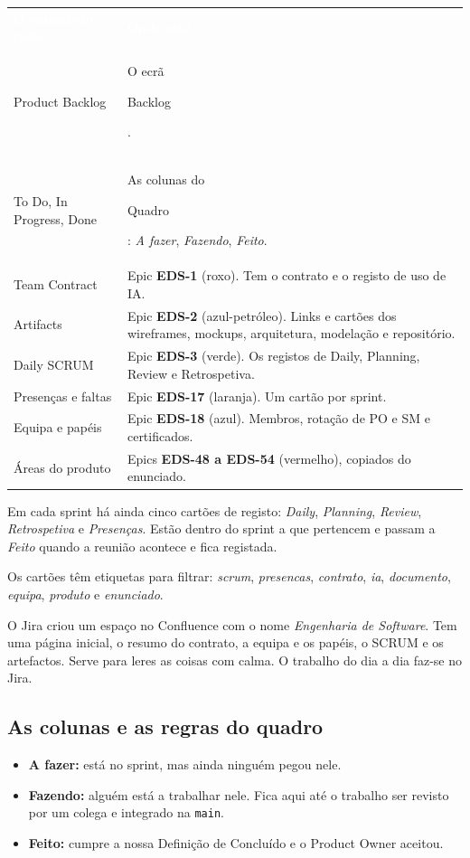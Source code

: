 \documentclass[11pt,a4paper]{article}
\newcommand{\th}[1]{\textcolor{white}{\sffamily\bfseries #1}}
\newcommand{\btn}[1]{{\setlength{\fboxsep}{1.6pt}\colorbox{azulclaro}{\sffamily\small\strut #1}}}
\newcommand{\tabelaini}{\begingroup\small\renewcommand{\arraystretch}{1.45}\rowcolors{2}{azulclaro!55}{white}}
\newcommand{\tabelafim}{\endgroup}
\begin{document}
\tabelaini
\begin{tabularx}{\textwidth}{L{3.6cm} Y}
   \th{O enunciado pede} & \th{Onde está} \\
  Product Backlog & O ecrã \btn{Backlog}. \\
  To Do, In Progress, Done & As colunas do \btn{Quadro}: \textit{A fazer}, \textit{Fazendo}, \textit{Feito}. \\
  Team Contract & Epic \textbf{EDS-1} (roxo). Tem o contrato e o registo de uso de IA. \\
  Artifacts & Epic \textbf{EDS-2} (azul-petróleo). Links e cartões dos wireframes, mockups, arquitetura, modelação e repositório. \\
  Daily SCRUM & Epic \textbf{EDS-3} (verde). Os registos de Daily, Planning, Review e Retrospetiva. \\
  Presenças e faltas & Epic \textbf{EDS-17} (laranja). Um cartão por sprint. \\
  Equipa e papéis & Epic \textbf{EDS-18} (azul). Membros, rotação de PO e SM e certificados. \\
  Áreas do produto & Epics \textbf{EDS-48 a EDS-54} (vermelho), copiados do enunciado. \\
  \bottomrule
\end{tabularx}
\tabelafim

Em cada sprint há ainda cinco cartões de registo: \textit{Daily}, \textit{Planning}, \textit{Review}, \textit{Retrospetiva} e \textit{Presenças}. Estão dentro do sprint a que pertencem e passam a \textit{Feito} quando a reunião acontece e fica registada.

Os cartões têm etiquetas para filtrar: \textit{scrum}, \textit{presencas}, \textit{contrato}, \textit{ia}, \textit{documento}, \textit{equipa}, \textit{produto} e \textit{enunciado}.

\begin{tcolorbox}[dica, title={Também há o Confluence}]
  O Jira criou um espaço no Confluence com o nome \textit{Engenharia de Software}. Tem uma página inicial, o resumo do contrato, a equipa e os papéis, o SCRUM e os artefactos. Serve para leres as coisas com calma. O trabalho do dia a dia faz-se no Jira.
\end{tcolorbox}

\subsection{As colunas e as regras do quadro}

\begin{itemize}
  \item \textbf{A fazer:} está no sprint, mas ainda ninguém pegou nele.
  \item \textbf{Fazendo:} alguém está a trabalhar nele. Fica aqui até o trabalho ser revisto por um colega e integrado na \texttt{main}.
  \item \textbf{Feito:} cumpre a nossa Definição de Concluído e o Product Owner aceitou.
\end{itemize}
\end{document}
